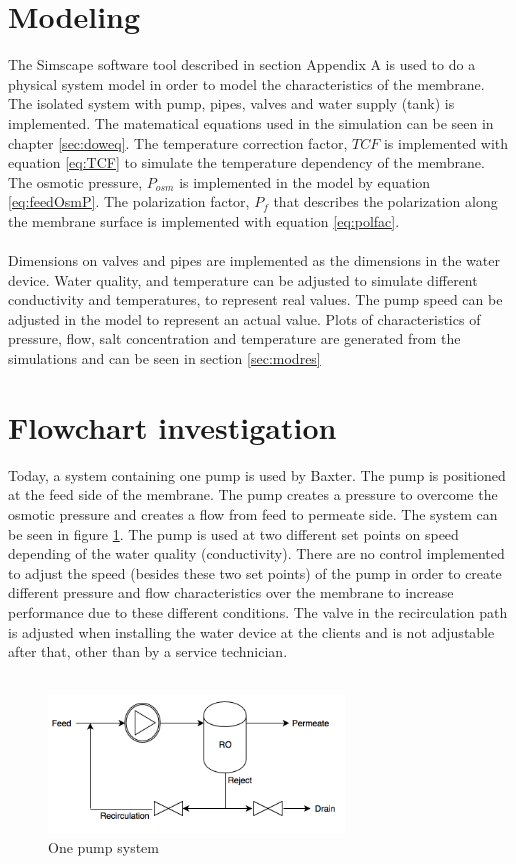 \clearpage
\section{Modeling}
The Simscape software tool described in section Appendix A is used to do a physical system model in order to model the characteristics of the membrane. The isolated system with pump, pipes, valves and water supply (tank) is implemented. The matematical equations used in the simulation can be seen in chapter \ref{sec:doweq}. The temperature correction factor, $TCF$ is implemented with equation \ref{eq:TCF} to simulate the temperature dependency of the membrane. The osmotic pressure, $P_{osm}$ is implemented in the model by equation \ref{eq:feedOsmP}. The polarization factor, $P_{f}$ that describes the polarization along the membrane surface is implemented with equation \ref{eq:polfac}. 
\\
\\
Dimensions on valves and pipes are implemented as the dimensions in the water device. Water quality, and temperature can be adjusted to simulate different conductivity and temperatures, to represent real values. The pump speed can be adjusted in the model to represent an actual value. Plots of characteristics of pressure, flow, salt concentration and temperature are generated from the simulations and can be seen in section \ref{sec:modres}

\section{Flowchart investigation}
\label{Flowchart}
Today, a system containing one pump is used by Baxter. The pump is positioned at the feed side of the membrane. The pump creates a pressure to overcome the osmotic pressure and creates a flow from feed to permeate side. The system can be seen in figure \ref{fig:System11}. The pump is used at two different set points on speed depending of the water quality (conductivity). There are no control implemented to adjust the speed (besides these two set points) of the pump in order to create different pressure and flow characteristics over the membrane to increase performance due to these different conditions. The valve in the recirculation path is adjusted when installing the water device at the clients and is not adjustable after that, other than by a service technician.\\
\\
\begin{figure}[H]
    \centering
    \includegraphics[width=0.7\textwidth]{Sys1}
    \caption{One pump system}
    \label{fig:System11}
\end{figure}

